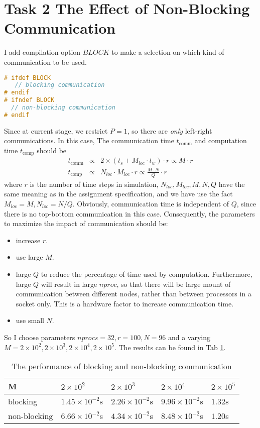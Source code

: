 \section{Task 2 The Effect of Non-Blocking Communication}

I add compilation option $BLOCK$ to make a selection on which kind of communication to be used.

\begin{lstlisting}[language=c]
# ifdef BLOCK
   // blocking communication
# endif
# ifndef BLOCK
  // non-blocking communication
# endif
\end{lstlisting}

Since at current stage, we restrict $P=1$, so there are \textit{only} left-right communications. In this case,
The communication time $t_{\textrm{comm}}$ and computation time $t_{\textrm{comp}}$ should be
\begin{eqnarray*}
	t_{\textrm{comm}} & \propto & 2\times \left( t_s + M_{loc}\cdot t_w  \right) \cdot r \propto M \cdot r \\
	t_{\textrm{comp}} & \propto & N_{loc} \cdot M_{loc} \cdot r \propto \frac{M\cdot N}{Q}\cdot r
\end{eqnarray*}
where $r$ is the number of time steps in simulation, $N_{loc}, M_{loc}, M, N, Q$ have the same meaning as in the 
assignment specification, and we have use the fact $M_{loc}=M, N_{loc} = N/Q$. Obviously, communication time
is independent of $Q$, since there is no top-bottom communication in this case. Consequently, the parameters
to maximize the impact of communication should be:

\begin{itemize}
	\item increase $r$.
	\item use large $M$.
	\item large $Q$ to reduce the percentage of time used by computation. Furthermore, large $Q$ will result in large 
		$nproc$, so that there will be large mount of communication between different nodes, rather than between
		processors in a socket only. This is a hardware factor to increase communication time.
	\item use small $N$.
\end{itemize}

So I choose parameters $nprocs = 32, r = 100, N = 96$ and a varying $M = 2\times10^2, 2\times 10^3, 2\times10^4, 2\times10^5$. 
The results can be found in Tab \ref{tab1}.

\begin{table}[h]
	\centering
	\caption{The performance of blocking and non-blocking communication}
	\label{tab1}
	\begin{tabular}{lllll}
		\hline
		M            & $2\times 10^2$ & $2\times 10^3$ & $2\times 10^4$ & $2\times 10^5$ \\ \hline
		blocking     & $1.45\times 10^{-2}$s &  $2.26\times 10^{-2}$s &   $9.96\times 10^{-2}$s &  $1.32$s \\
		non-blocking & $6.66\times 10^{-2}$s & $4.34\times 10^{-2}$s & $8.48\times 10^{-2}$s & $1.20$s \\ \hline
	\end{tabular}
\end{table}

